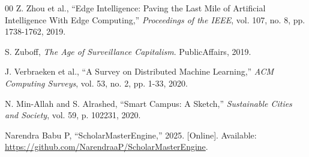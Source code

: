 \documentclass[conference]{IEEEtran}
\begin{document}
\begin{thebibliography}{00}
 Z. Zhou et al., ``Edge Intelligence: Paving the Last Mile of Artificial Intelligence With Edge Computing,'' \textit{Proceedings of the IEEE}, vol. 107, no. 8, pp. 1738-1762, 2019.


 S. Zuboff, \textit{The Age of Surveillance Capitalism}. PublicAffairs, 2019.

 J. Verbraeken et al., ``A Survey on Distributed Machine Learning,'' \textit{ACM Computing Surveys}, vol. 53, no. 2, pp. 1-33, 2020.


 N. Min-Allah and S. Alrashed, ``Smart Campus: A Sketch,'' \textit{Sustainable Cities and Society}, vol. 59, p. 102231, 2020.


 Narendra Babu P, ``ScholarMasterEngine,'' 2025. [Online]. Available: \url{https://github.com/NarendraaP/ScholarMasterEngine}.

\end{thebibliography}
\end{document}

